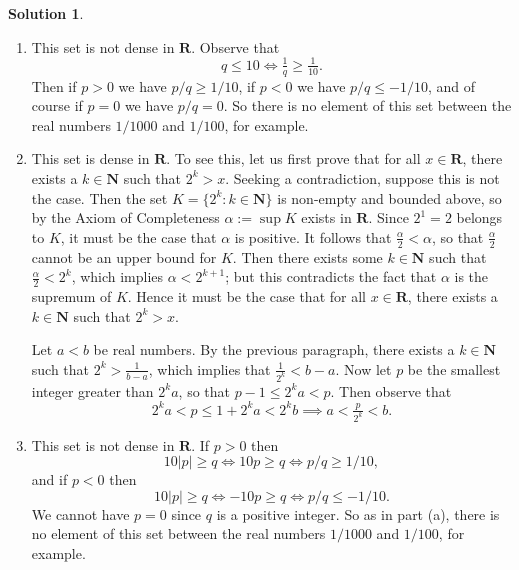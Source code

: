 \documentclass[12pt]{article}
\theoremstyle{definition}
\theoremstyle{exercise}
\theoremstyle{solution}
\newtheorem*{solution}{Solution}
\newcommand{\N}{\mathbf{N}}
\newcommand{\R}{\mathbf{R}}
\begin{document}
\begin{solution}
    \begin{enumerate}
        \item This set is not dense in \( \R \). Observe that
        \[
            q \leq 10 \iff \tfrac{1}{q} \geq \tfrac{1}{10}.
        \]
        Then if \( p > 0 \) we have \( p/q \geq 1/10 \), if \( p < 0 \) we have \( p/q \leq -1/10 \), and of course if \( p = 0 \) we have \( p/q = 0 \). So there is no element of this set between the real numbers \( 1/1000 \) and \( 1/100 \), for example.

        \item This set is dense in \( \R \). To see this, let us first prove that for all \( x \in \R \), there exists a \( k \in \N \) such that \( 2^k > x \). Seeking a contradiction, suppose this is not the case. Then the set \( K = \{ 2^k : k \in \N \} \) is non-empty and bounded above, so by the Axiom of Completeness \( \alpha := \sup K \) exists in \( \R \). Since \( 2^1 = 2 \) belongs to \( K \), it must be the case that \( \alpha \) is positive. It follows that \( \tfrac{\alpha}{2} < \alpha \), so that \( \tfrac{\alpha}{2} \) cannot be an upper bound for \( K \). Then there exists some \( k \in \N \) such that \( \tfrac{\alpha}{2} < 2^k \), which implies \( \alpha < 2^{k+1} \); but this contradicts the fact that \( \alpha \) is the supremum of \( K \). Hence it must be the case that for all \( x \in \R \), there exists a \( k \in \N \) such that \( 2^k > x \).

        Let \( a < b \) be real numbers. By the previous paragraph, there exists a \( k \in \N \) such that \( 2^k > \tfrac{1}{b-a} \), which implies that \( \tfrac{1}{2^k} < b - a \). Now let \( p \) be the smallest integer greater than \( 2^k a \), so that \( p - 1 \leq 2^k a < p \). Then observe that
        \[
            2^k a < p \leq 1 + 2^k a < 2^k b \implies a < \tfrac{p}{2^k} < b.
        \]

        \item This set is not dense in \( \R \). If \( p > 0 \) then
        \[
            10|p| \geq q \iff 10p \geq q \iff p/q \geq 1/10,
        \]
        and if \( p < 0 \) then
        \[
            10|p| \geq q \iff -10p \geq q \iff p/q \leq -1/10.
        \]
        We cannot have \( p = 0 \) since \( q \) is a positive integer. So as in part (a), there is no element of this set between the real numbers \( 1/1000 \) and \( 1/100 \), for example.
    \end{enumerate}
\end{solution}
\end{document}

